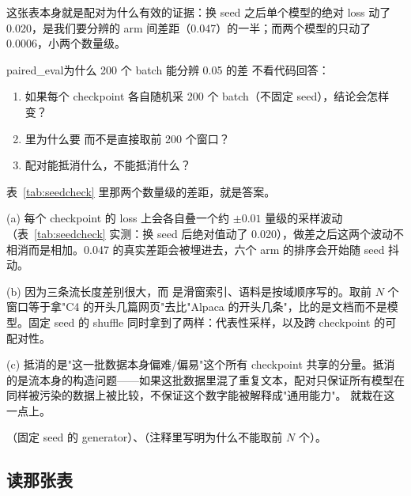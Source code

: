 这张表本身就是配对为什么有效的证据：换 seed 之后单个模型的绝对 loss 动了 0.020，是我们要分辨的 arm 间差距（0.047）的一半；而两个模型的只动了 0.0006，小两个数量级。

\begin{checkpoint}{paired_eval}{为什么 200 个 batch 能分辨 0.05 的差}
不看代码回答：
\begin{enumerate}[label=(\alph*)]
  \item 如果每个 checkpoint 各自随机采 200 个 batch（不固定 seed），结论会怎样变？
  \item {} 里为什么要  而不是直接取前 200 个窗口？
  \item 配对能抵消什么，不能抵消什么？
\end{enumerate}
\hint 表~\ref{tab:seedcheck} 里那两个数量级的差距，就是答案。

\ifshowanswers
\tcblower
\answer (a) 每个 checkpoint 的 loss 上会各自叠一个约 $\pm 0.01$ 量级的采样波动（表~\ref{tab:seedcheck} 实测：换 seed 后绝对值动了 0.020），做差之后这两个波动不相消而是相加。0.047 的真实差距会被埋进去，六个 arm 的排序会开始随 seed 抖动。

(b) 因为三条流长度差别很大，而  是滑窗索引、语料是按域顺序写的。取前 $N$ 个窗口等于拿"C4 的开头几篇网页"去比"Alpaca 的开头几条"，比的是文档而不是模型。固定 seed 的 shuffle 同时拿到了两样：代表性采样，以及跨 checkpoint 的可配对性。

(c) 抵消的是"这一批数据本身偏难/偏易"这个所有 checkpoint 共享的分量。抵消的是流本身的构造问题——如果这批数据里混了重复文本，配对只保证所有模型在同样被污染的数据上被比较，不保证这个数字能被解释成"通用能力"。 就栽在这一点上。

\whereincode {}（固定 seed 的 generator）、（注释里写明为什么不能取前 $N$ 个）。
\fi
\end{checkpoint}

\subsection{读那张表}
\label{sec:b-sft-table}

